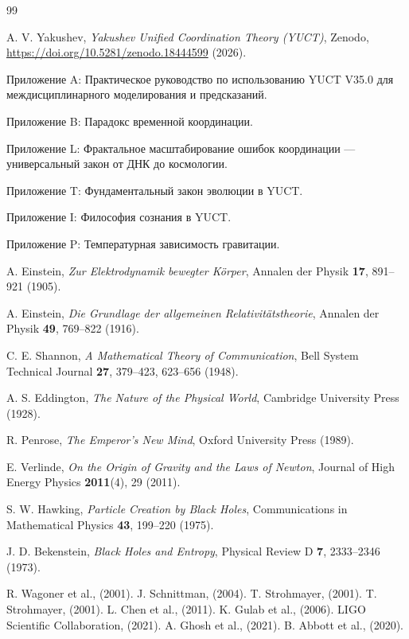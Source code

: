 \documentclass[12pt,a4paper]{article}
\begin{document}
	\begin{thebibliography}{99}
		
		A. V. Yakushev, \emph{Yakushev Unified Coordination Theory (YUCT)}, Zenodo, \url{https://doi.org/10.5281/zenodo.18444599} (2026).
		
		Приложение A: Практическое руководство по использованию YUCT V35.0 для междисциплинарного моделирования и предсказаний.
		
		Приложение B: Парадокс временной координации.
		
		Приложение L: Фрактальное масштабирование ошибок координации — универсальный закон от ДНК до космологии.
		
		Приложение T: Фундаментальный закон эволюции в YUCT.
		
		Приложение I: Философия сознания в YUCT.
		
		Приложение P: Температурная зависимость гравитации.
		
		A. Einstein, \emph{Zur Elektrodynamik bewegter Körper}, Annalen der Physik \textbf{17}, 891–921 (1905).
		
		A. Einstein, \emph{Die Grundlage der allgemeinen Relativitätstheorie}, Annalen der Physik \textbf{49}, 769–822 (1916).
		
		C. E. Shannon, \emph{A Mathematical Theory of Communication}, Bell System Technical Journal \textbf{27}, 379–423, 623–656 (1948).
		
		A. S. Eddington, \emph{The Nature of the Physical World}, Cambridge University Press (1928).
		
		R. Penrose, \emph{The Emperor's New Mind}, Oxford University Press (1989).
		
		E. Verlinde, \emph{On the Origin of Gravity and the Laws of Newton}, Journal of High Energy Physics \textbf{2011}(4), 29 (2011).
		
		S. W. Hawking, \emph{Particle Creation by Black Holes}, Communications in Mathematical Physics \textbf{43}, 199–220 (1975).
		
		J. D. Bekenstein, \emph{Black Holes and Entropy}, Physical Review D \textbf{7}, 2333–2346 (1973).
		
		 R. Wagoner et al., (2001).
		 J. Schnittman, (2004).
		 T. Strohmayer, (2001).
		 T. Strohmayer, (2001).
		 L. Chen et al., (2011).
		 K. Gulab et al., (2006).
		 LIGO Scientific Collaboration, (2021).
		 A. Ghosh et al., (2021).
		 B. Abbott et al., (2020).
		
	\end{thebibliography}
	
\end{document}
